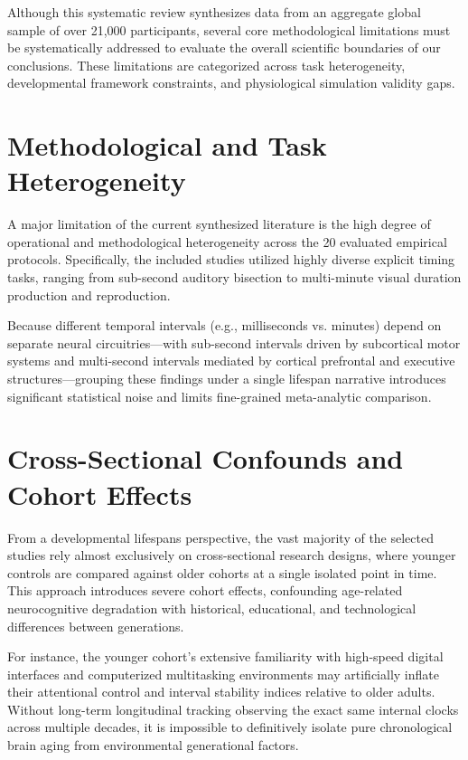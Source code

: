 \documentclass{custom_report}
\begin{document}
Although this systematic review synthesizes data from an aggregate global sample of over 21,000 participants, several core methodological limitations must be systematically addressed to evaluate the overall scientific boundaries of our conclusions. These limitations are categorized across task heterogeneity, developmental framework constraints, and physiological simulation validity gaps.

\section{Methodological and Task Heterogeneity}
A major limitation of the current synthesized literature is the high degree of operational and methodological heterogeneity across the 20 evaluated empirical protocols. Specifically, the included studies utilized highly diverse explicit timing tasks, ranging from sub-second auditory bisection to multi-minute visual duration production and reproduction. 

Because different temporal intervals (e.g., milliseconds vs. minutes) depend on separate neural circuitries—with sub-second intervals driven by subcortical motor systems and multi-second intervals mediated by cortical prefrontal and executive structures—grouping these findings under a single lifespan narrative introduces significant statistical noise and limits fine-grained meta-analytic comparison.

\section{Cross-Sectional Confounds and Cohort Effects}
From a developmental lifespans perspective, the vast majority of the selected studies rely almost exclusively on cross-sectional research designs, where younger controls are compared against older cohorts at a single isolated point in time. This approach introduces severe cohort effects, confounding age-related neurocognitive degradation with historical, educational, and technological differences between generations. 

For instance, the younger cohort's extensive familiarity with high-speed digital interfaces and computerized multitasking environments may artificially inflate their attentional control and interval stability indices relative to older adults. Without long-term longitudinal tracking observing the exact same internal clocks across multiple decades, it is impossible to definitively isolate pure chronological brain aging from environmental generational factors.
\end{document}
